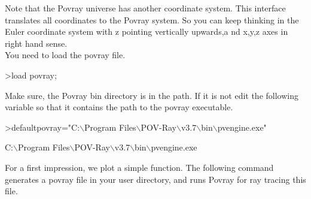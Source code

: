 \documentclass[a4paper,10pt]{article}
\begin{document}
\begin{eulernotebook}
\begin{eulercomment}
Note that the Povray universe has another coordinate system. This interface translates all coordinates to the Povray
system. So you can keep thinking in the Euler coordinate system with z pointing vertically upwards,a nd x,y,z axes in
right hand sense.\\
You need to load the povray file.
\end{eulercomment}
\begin{eulerprompt}
>load povray;
\end{eulerprompt}
\begin{eulercomment}
Make sure, the Povray bin directory is in the path. If it is not edit the following variable so that it contains the path
to the povray executable.
\end{eulercomment}
\begin{eulerprompt}
>defaultpovray="C:\(\backslash\)Program Files\(\backslash\)POV-Ray\(\backslash\)v3.7\(\backslash\)bin\(\backslash\)pvengine.exe"
\end{eulerprompt}
\begin{euleroutput}
  C:\(\backslash\)Program Files\(\backslash\)POV-Ray\(\backslash\)v3.7\(\backslash\)bin\(\backslash\)pvengine.exe
\end{euleroutput}
\begin{eulercomment}
For a first impression, we plot a simple function. The following command generates a povray file in your user directory,
and runs Povray for ray tracing this file.


\end{eulercomment}
\end{eulernotebook}
\end{document}
